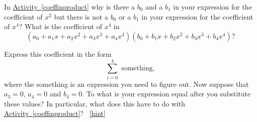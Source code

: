 \documentclass{book}
\begin{document}
\setcounter{project}{246}
\addtocounter{project}{-1}
\begin{activity}[]\label{coeffinproduct1}
\hypertarget{p-1337}{}%
In \hyperref[coeffinproduct]{Activity~\ref{coeffinproduct}} why is there a \(b_0\) and a \(b_1\) in your expression for the coefficient of \(x^2\) but there is not a \(b_0\) or a \(b_1\) in your expression for the coefficient of \(x^4\)? What is the coefficient of \(x^4\) in%
\begin{equation*}
(a_0+a_1x+a_2x^2+a_3x^3+a_4x^4)(b_0+b_1x+b_2x^2
+b_3x^3+b_4x^4)?
\end{equation*}
%
\par
\hypertarget{p-1338}{}%
Express this coefficient in the form%
\begin{equation*}
\sum_{i=0}^4 \mbox{ something} ,
\end{equation*}
where the something is an expression you need to figure out. Now suppose that \(a_3=0\), \(a_4=0\) and \(b_4=0\). To what is your expression equal after you substitute these values? In particular, what does this have to do with \hyperref[coeffinproduct]{Activity~\ref{coeffinproduct}}?%
~\hfill{\tiny\hyperlink{a-246}{[hint]}\hypertarget{q-246}{}}\end{activity}
\end{document}
